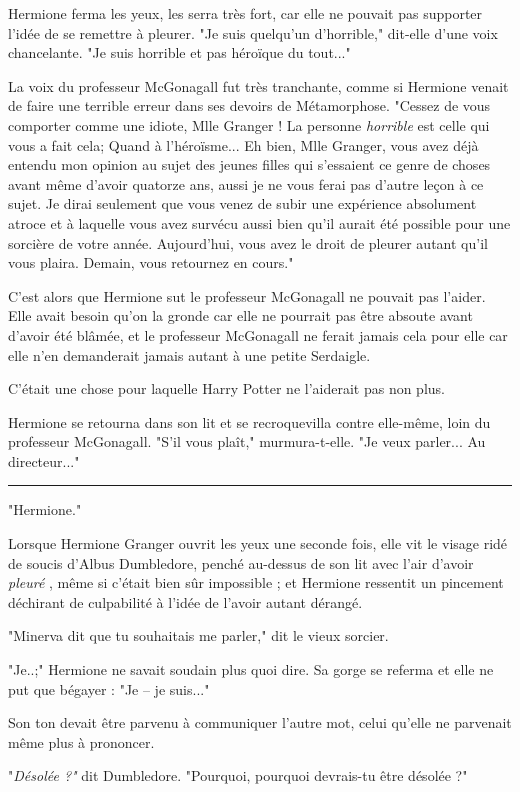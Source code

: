 Hermione ferma les yeux, les serra très fort, car elle ne pouvait pas supporter l'idée de se remettre à pleurer. "Je suis quelqu'un d'horrible," dit-elle d'une voix chancelante. "Je suis horrible et pas héroïque du tout..."

La voix du professeur McGonagall fut très tranchante, comme si Hermione venait de faire une terrible erreur dans ses devoirs de Métamorphose. "Cessez de vous comporter comme une idiote, Mlle Granger ! La personne \emph{horrible}  est celle qui vous a fait cela; Quand à l'héroïsme... Eh bien, Mlle Granger, vous avez déjà entendu mon opinion au sujet des jeunes filles qui s'essaient ce genre de choses avant même d'avoir quatorze ans, aussi je ne vous ferai pas d'autre leçon à ce sujet. Je dirai seulement que vous venez de subir une expérience absolument atroce et à laquelle vous avez survécu aussi bien qu'il aurait été possible pour une sorcière de votre année. Aujourd'hui, vous avez le droit de pleurer autant qu'il vous plaira. Demain, vous retournez en cours."

C'est alors que Hermione sut le professeur McGonagall ne pouvait pas l'aider. Elle avait besoin qu'on la gronde car elle ne pourrait pas être absoute avant d'avoir été blâmée, et le professeur McGonagall ne ferait jamais cela pour elle car elle n'en demanderait jamais autant à une petite Serdaigle.

C'était une chose pour laquelle Harry Potter ne l'aiderait pas non plus.

Hermione se retourna dans son lit et se recroquevilla contre elle-même, loin du professeur McGonagall. "S'il vous plaît," murmura-t-elle. "Je veux parler... Au directeur..."
\par\noindent\rule{\textwidth}{0.4pt}
"Hermione."

Lorsque Hermione Granger ouvrit les yeux une seconde fois, elle vit le visage ridé de soucis d'Albus Dumbledore, penché au-dessus de son lit avec l'air d'avoir \emph{pleuré} , même si c'était bien sûr impossible ; et Hermione ressentit un pincement déchirant de culpabilité à l'idée de l'avoir autant dérangé.

"Minerva dit que tu souhaitais me parler," dit le vieux sorcier.

"Je..;" Hermione ne savait soudain plus quoi dire. Sa gorge se referma et elle ne put que bégayer : "Je – je suis..."

Son ton devait être parvenu à communiquer l'autre mot, celui qu'elle ne parvenait même plus à prononcer.

"\emph{Désolée ?"}  dit Dumbledore. "Pourquoi, pourquoi devrais-tu être désolée ?"

